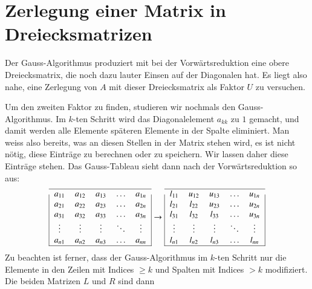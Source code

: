%
%
%
\section{Zerlegung einer Matrix in Dreiecksmatrizen}
Der Gauss-Algorithmus produziert mit bei der Vorwärtsreduktion eine
obere Dreiecksmatrix, die noch dazu lauter Einsen auf der Diagonalen
hat.
Es liegt also nahe, eine Zerlegung von $A$ mit dieser Dreiecksmatrix
als Faktor $U$ zu versuchen.

Um den zweiten Faktor zu finden, studieren wir nochmals den
Gauss-Algorithmus.
Im $k$-ten Schritt wird das Diagonalelement
$a_{kk}$ zu $1$ gemacht, und damit werden alle Elemente späteren
Elemente in der Spalte eliminiert.
Man weiss also bereits, was an
diesen Stellen in der Matrix stehen wird, es ist nicht nötig, diese
Einträge zu berechnen oder zu speichern.
Wir lassen daher diese Einträge stehen.
Das Gauss-Tableau sieht dann nach der Vorwärtsreduktion
so aus:
\[
\begin{tabular}{|>{$}c<{$}>{$}c<{$}>{$}c<{$}>{$}c<{$}>{$}c<{$}|}
\hline
a_{11}&a_{12}&a_{13}&\dots &a_{1n}\\
a_{21}&a_{22}&a_{23}&\dots &a_{2n}\\
a_{31}&a_{32}&a_{33}&\dots &a_{3n}\\
\vdots&\vdots&\vdots&\ddots&\vdots\\
a_{n1}&a_{n2}&a_{n3}&\dots &a_{nn}\\
\hline
\end{tabular}
\rightarrow
\begin{tabular}{|>{$}c<{$}>{$}c<{$}>{$}c<{$}>{$}c<{$}>{$}c<{$}|}
\hline
l_{11}&u_{12}&u_{13}&\dots &u_{1n}\\
l_{21}&l_{22}&u_{23}&\dots &u_{2n}\\
l_{31}&l_{32}&l_{33}&\dots &u_{3n}\\
\vdots&\vdots&\vdots&\ddots&\vdots\\
l_{n1}&l_{n2}&l_{n3}&\dots &l_{nn}\\
\hline
\end{tabular}
\]
Zu beachten ist ferner, dass der Gauss-Algorithmus im $k$-ten Schritt nur 
die Elemente in den Zeilen mit Indices $\ge k$ und Spalten mit Indices $>k$ 
modifiziert.
Die beiden Matrizen $L$ und $R$ sind dann
